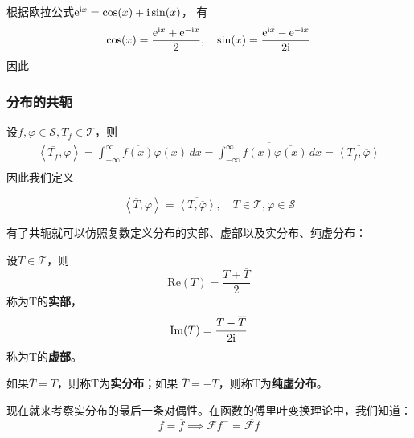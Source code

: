 \begin{example}[正弦、余弦函数的傅里叶变换]
根据欧拉公式$\mathrm{e}^{\mathrm{i} x}=\cos(x)+\mathrm{i}\sin(x)$，
有\[\cos(x)=\frac{\mathrm{e}^{\mathrm{i} x}+\mathrm{e}^{-\mathrm{i} x}}{2},\quad\sin(x)=\frac{\mathrm{e}^{\mathrm{i} x}-\mathrm{e}^{-\mathrm{i} x}}{2\mathrm{i}}\]因此
\end{example}

\subsubsection{分布的共轭}

设$f,\varphi\in\mathcal{S} ,T_f\in\mathcal{T} $，则
\begin{align*}
    \left\langle \overline{T_f},\varphi\right\rangle=\int_{-\infty}^{\infty}\overline{f(x)}\varphi(x)\,dx=\overline{\int_{-\infty}^{\infty}f(x)\overline{\varphi(x)}\,dx}=\overline{\left\langle T_f,\overline{\varphi}\right\rangle} \\
\end{align*}
因此我们定义\begin{definition}[分布的共轭]
    \begin{equation*}
    \left\langle \overline{T},\varphi\right\rangle=\overline{\left\langle T,\overline{\varphi}\right\rangle},\quad T\in\mathcal{T} ,\varphi\in\mathcal{S}
\end{equation*}
\end{definition}

有了共轭就可以仿照复数定义分布的实部、虚部以及实分布、纯虚分布：
\begin{definition}[分布的实部、虚部]
    设$T\in\mathcal{T} $，则
    \[\mathrm{Re}(T)=\frac{T+\overline{T}}{2}\]
    称为T的\textbf{实部}，
    \[\mathrm{Im}(T)=\frac{T-\overline{T}}{2\mathrm{i}}\]
    称为T的\textbf{虚部}。
\end{definition}
\begin{definition}[实分布与纯虚分布]
如果$\overline{T}=T$，则称T为\textbf{实分布}；如果
$\overline{T}=-T$，则称T为\textbf{纯虚分布}。
\end{definition}
现在就来考察实分布的最后一条对偶性。在函数的傅里叶变换理论中，我们知道：
    \[f=\overline{f}\implies \mathcal{F}f^- =\overline{\mathcal{F} f}\]

